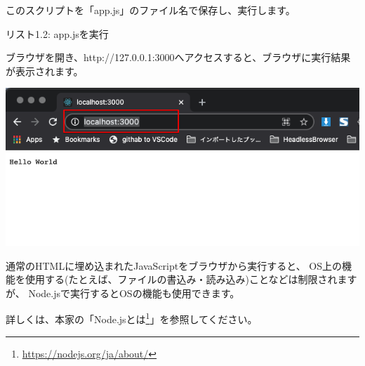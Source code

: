 このスクリプトを「app.js」のファイル名で保存し、実行します。

\def\startercodeblockfontsize{}
\begin{starterterminal}[_022103517]{リスト1.2: app.jsを実行}\end{starterterminal}

ブラウザを開き、http://127.0.0.1:3000へアクセスすると、ブラウザに実行結果が表示されます。

\begin{reviewimage}%
\includegraphics[width=1.0\maxwidth]{./images/01-createDevEnv/01_00browser_helloWorld.png}%
\label{image:01-createDevEnv:01_00browser_helloWorld}
\end{reviewimage}

\clearpage


通常のHTMLに埋め込まれたJavaScriptをブラウザから実行すると、
OS上の機能を使用する(たとえば、ファイルの書込み・読み込み)ことなどは制限されますが、
Node.jsで実行するとOSの機能も使用できます。

\begin{starternote}[]{}

詳しくは、本家の「Node.jsとは\footnote{\url{https://nodejs.org/ja/about/}}」を参照してください。

\end{starternote}

\clearpage


